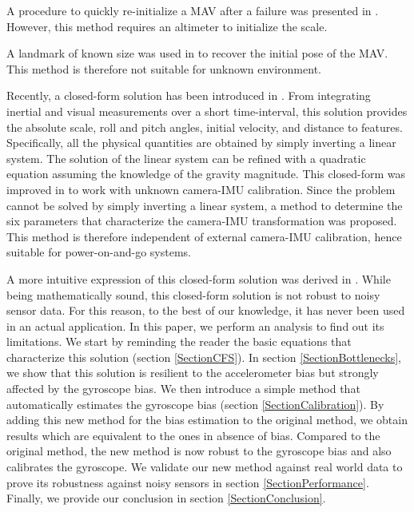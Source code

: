 \documentclass[letterpaper, 10 pt, conference]{ieeeconf}  %
\begin{document}

A procedure to quickly re-initialize a MAV after a failure was presented in \cite{Faessler2015}.
However, this method requires an altimeter to initialize the scale.

A landmark of known size was used in \cite{Gemeiner2007} to recover the initial pose of the MAV.
This method is therefore not suitable for unknown environment.

Recently, a closed-form solution has been introduced in \cite{Martinelli2012}.
From integrating inertial and visual measurements over a short time-interval, this solution provides the absolute scale, roll and pitch angles, initial velocity, and distance to features.
Specifically, all the physical quantities are obtained by simply inverting a linear system.
The solution of the linear system can be refined with a quadratic equation assuming the knowledge of the gravity magnitude.
This closed-form was improved in \cite{Li2013} to work with unknown camera-IMU calibration.
Since the problem cannot be solved by simply inverting a linear system, a method to determine the six parameters that characterize the camera-IMU transformation was proposed.
This method is therefore independent of external camera-IMU calibration, hence suitable for power-on-and-go systems.

A more intuitive expression of this closed-form solution was derived in \cite{Martinelli2014}.
While being mathematically sound, this closed-form solution is not robust to noisy sensor data.
For this reason, to the best of our knowledge, it has never been used in an actual application.
In this paper, we perform an analysis to find out its limitations. We start by reminding the reader the basic equations that characterize this solution (section \ref{SectionCFS}).
In section \ref{SectionBottlenecks}, we show that this solution is resilient to the accelerometer bias but strongly affected by the gyroscope bias.
We then introduce a simple method that automatically estimates the gyroscope bias (section \ref{SectionCalibration}).
By adding this new method for the bias estimation to the original method, we obtain results which are equivalent to the ones in absence of bias.
Compared to the original method, the new method is now robust to the gyroscope bias and also calibrates the gyroscope.
We validate our new method against real world data to prove its robustness against noisy sensors
in section \ref{SectionPerformance}. Finally, we provide our conclusion in section \ref{SectionConclusion}.
\end{document}

